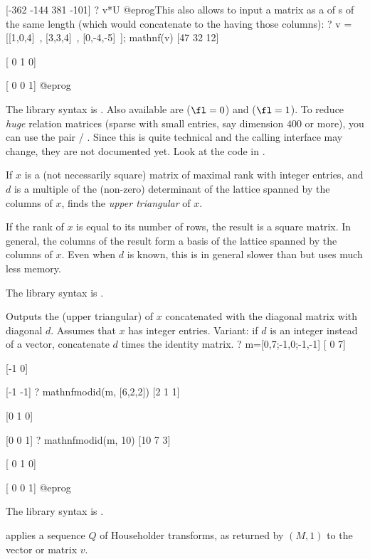 [-362 -144   381 -101]
? v*U
@eprog\noindent This also allows to input a matrix as a  of
s of the same length (which  would concatenate to
the  having those columns):
\bprog
? v = [[1,0,4]~, [3,3,4]~, [0,-4,-5]~]; mathnf(v)
[47 32 12]

[ 0  1  0]

[ 0  0  1]
@eprog

The library syntax is .
Also available are  ($\fl=0$) and
 ($\fl=1$). To reduce \emph{huge} relation matrices
(sparse with small entries, say dimension $400$ or more), you can use the
pair  / . Since this is quite technical and the
calling interface may change, they are not documented yet. Look at the code
in .

\label{se:mathnfmod}
If $x$ is a (not necessarily square) matrix of
maximal rank with integer entries, and $d$ is a multiple of the (non-zero)
determinant of the lattice spanned by the columns of $x$, finds the
\emph{upper triangular}  of $x$.

If the rank of $x$ is equal to its number of rows, the result is a square
matrix. In general, the columns of the result form a basis of the lattice
spanned by the columns of $x$. Even when $d$ is known, this is in general
slower than  but uses much less memory.

The library syntax is .

\label{se:mathnfmodid}
Outputs the (upper triangular)
 of $x$ concatenated with the diagonal
matrix with diagonal $d$. Assumes that $x$ has integer entries.
Variant: if $d$ is an integer instead of a vector, concatenate $d$ times the
identity matrix.
\bprog
? m=[0,7;-1,0;-1,-1]
[ 0  7]

[-1  0]

[-1 -1]
? mathnfmodid(m, [6,2,2])
[2 1 1]

[0 1 0]

[0 0 1]
? mathnfmodid(m, 10)
[10 7 3]

[ 0 1 0]

[ 0 0 1]
@eprog

The library syntax is .

\label{se:mathouseholder}
applies a sequence $Q$ of Householder
transforms, as returned by $(M,1)$ to the vector or matrix $v$.

